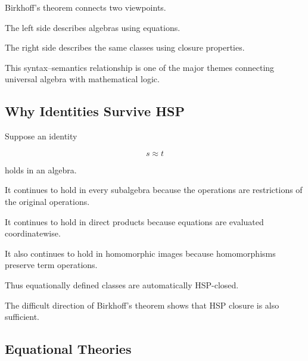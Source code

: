 Birkhoff's theorem connects two viewpoints.

\begin{center}
\end{center}

The left side describes algebras using equations.

The right side describes the same classes using closure properties.

This syntax--semantics relationship is one of the major themes connecting
universal algebra with mathematical logic.

\subsection{Why Identities Survive HSP}
\label{subsec:identities-survive-hsp}

Suppose an identity

\[ s\approx t \]

holds in an algebra.

It continues to hold in every subalgebra because the operations are
restrictions of the original operations.

It continues to hold in direct products because equations are evaluated
coordinatewise.

It also continues to hold in homomorphic images because homomorphisms
preserve term operations.

Thus equationally defined classes are automatically HSP-closed.

The difficult direction of Birkhoff's theorem shows that HSP closure is also
sufficient.

\subsection{Equational Theories}
\label{subsec:equational-theories}

